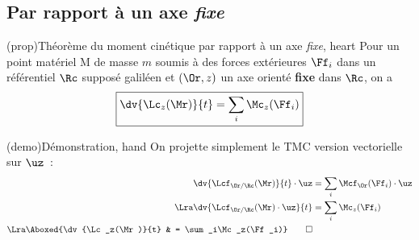 \documentclass[../../main/main.tex]{subfiles}
\begin{document}
\subsection{Par rapport à un axe  \textit{fixe}}
\begin{tcb*}(prop){Théorème du moment cinétique par rapport à un axe 
			\textit{fixe}, heart}
	Pour un point matériel M de masse $m$ soumis à des forces extérieures
	$\Ff_i$ dans un référentiel $\Rc$ supposé galiléen et $(\Or,z)$ un axe
	orienté \textbf{fixe} dans $\Rc$, on a
	\[\boxed{\dv{\Lc_z(\Mr)}{t} = \sum_i\Mc_z(\Ff_i)}\]
\end{tcb*}
\begin{tcb*}(demo){Démonstration, hand}
	On projette simplement le TMC version vectorielle sur $\uz$~:
	\begin{align*}
		\dv{\Lcf_{\Or/\Rc}(\Mr)}{t}\cdot\uz & = \sum_i\Mcf_{\Or}(\Ff_i)\cdot\uz
		\\\Lra
		\dv{\Lcf_{\Or/\Rc}(\Mr)\cdot\uz}{t} & = \sum_i\Mc_z(\Ff_i)
		\\\Lra
		\Aboxed{\dv{\Lc_z(\Mr)}{t}          & = \sum_i\Mc_z(\Ff_i)}
		\qed
	\end{align*}
\end{tcb*}
\end{document}
